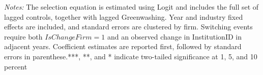 \documentclass[11pt]{article}
\begin{document}
\begin{table}[H]
    \centering
    \caption{Auditor-Switching Selection Equation}
    \label{tab:auditor-selection}
    \renewcommand{\arraystretch}{1.3}
    \par\smallskip
    \begin{minipage}{0.95\textwidth}
        \footnotesize
        \textit{Notes:} The selection equation is estimated using Logit and includes the full set of lagged controls, together with lagged Greenwashing. Year and industry fixed effects are included, and standard errors are clustered by firm. Switching events require both \(IsChangeFirm=1\) and an observed change in InstitutionID in adjacent years. Coefficient estimates are reported first, followed by standard errors
        in parenthese.***, **, and * indicate two-tailed significance at 1, 5, and 10 percent
    \end{minipage}
\end{table}

\clearpage
\end{document}
